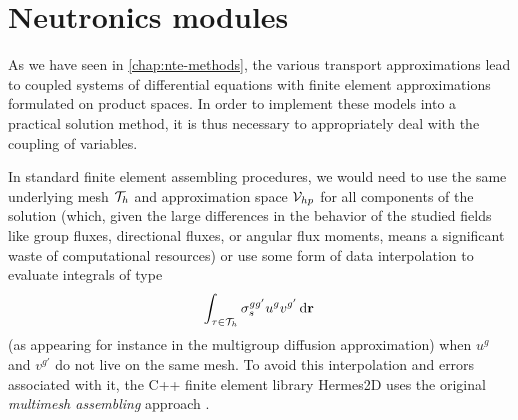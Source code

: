 \ifpdf
	\graphicspath{{5/pic/PNG/}{5/pic/PDF/}{5/pic/}}
\else
	\graphicspath{{5/pic/EPS/}{5/pic/}}
\fi

\chapter{Neutronics modules}\label{chap:hermes}

As we have seen in \cref{chap:nte-methods}, the various transport approximations lead to coupled systems of differential
equations with finite element approximations formulated on product spaces. In order to implement these models into a
practical solution method, it is thus necessary to appropriately deal with the coupling of variables. 

In standard finite element
assembling procedures, we would need to use the same underlying mesh $\mathcal{T}_{h}$ and approximation space $\mathcal{V}_{hp}$ for
all components of the solution (which, given the large differences in the behavior of the studied fields like group
fluxes, directional fluxes, or angular flux moments, means a significant waste of computational resources) or use some
form of data interpolation to evaluate integrals of type 
\begin{equation}\label{eq:mixed_int}
	\int_{\tau\in\mathcal{T}_{h}} \sigma_s^{gg'} u^g v^{g'}\,\text{d}\mathbf{r}\,
\end{equation}
(as appearing for instance in the multigroup diffusion approximation) when $u^g$ and $v^{g'}$ do not live on the same
mesh. To avoid this interpolation and errors associated with it, the C++ finite element library Hermes2D uses the
original \textit{multimesh assembling} approach \cite{Hermes-thermoelasticity}. 

